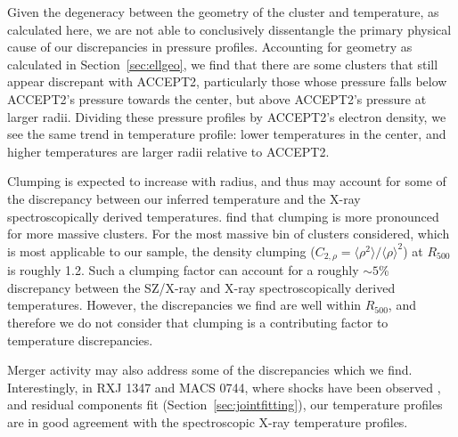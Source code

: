 \documentclass[iop,numberedappendix,apj]{emulateapj}
\begin{document}
Given the degeneracy between the geometry of the cluster and temperature, as calculated here, we are not able to 
conclusively dissentangle the primary physical cause of our discrepancies in pressure profiles. 
Accounting for geometry as calculated in Section~\ref{sec:ellgeo}, we find that there are some clusters that still 
appear discrepant with ACCEPT2, particularly those whose pressure falls below ACCEPT2's pressure towards the center, 
but above ACCEPT2's pressure at larger radii. Dividing these pressure profiles by ACCEPT2's electron density, we see
the same trend in temperature profile: lower temperatures in the center, and higher temperatures are larger radii 
relative to ACCEPT2.

Clumping is expected to increase with radius, and thus may account for some of the discrepancy between our inferred 
temperature and the X-ray spectroscopically derived temperatures. \citet{battaglia2015} find that clumping
is more pronounced for more massive clusters. For the most massive bin of clusters considered, which is most applicable to our
sample, the density clumping ($C_{2,\rho} = \langle \rho^2 \rangle / \langle \rho \rangle ^2$) at $R_{500}$ is roughly 1.2. 
Such a clumping factor can account for a roughly $\sim5$\% discrepancy between the SZ/X-ray and X-ray spectroscopically derived 
temperatures. However, the discrepancies we find are well within $R_{500}$, and therefore we do not consider that clumping
is a contributing factor to temperature discrepancies.

Merger activity may also address some of the discrepancies which we find. Interestingly, in RXJ 1347 and MACS 0744, 
where shocks have been observed \citep{kitayama2004,mason2010,korngut2011}, and residual components fit 
(Section~\ref{sec:jointfitting}), our temperature profiles are in good agreement with the spectroscopic X-ray temperature 
profiles. 
\end{document}
